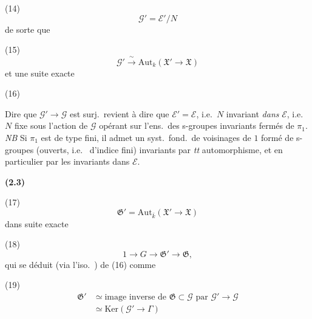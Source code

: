 \documentclass[11pt,a4paper]{article}
\begin{document}
(14)
\[
  \mathcal{G}' = \mathcal{E}'/N
\]
de sorte que

(15)
\[
  \mathcal{G}' \xrightarrow{\ \sim\ } \mathrm{Aut}_k(\mathfrak{X}' \to \mathfrak{X})
\]
et une suite exacte

(16)



Dire que $\mathcal{G}' \to \mathcal{G}$ est surj.\ revient à dire que $\mathcal{E}' = \mathcal{E}$, i.e.\ $N$ invariant \emph{dans} $\mathcal{E}$, i.e.\ $N$  fixe sous l'action de $\mathcal{G}$ opérant sur l'ens.\ des s-groupes invariants fermés de $\pi_1$. \emph{NB} Si $\pi_1$ est de type fini, il admet un syst.\ fond.\ de voisinages de $1$ formé de s-groupes (ouverts, i.e.\  d'indice fini) invariants  par \emph{tt} automorphisme, et en particulier par les invariants dans $\mathcal{E}$.


\textbf{(2.3)} 

(17)
\[
  \mathfrak{G}' = \mathrm{Aut}_{\bar{k}}(\mathfrak{X}' \to \mathfrak{X})
\]
 dans suite exacte

(18)
\[
  1 \to G \to \mathfrak{G}' \to \mathfrak{G} ,
\]
qui se déduit (via l'iso.\ ) de (16) comme

(19)
\[
  \begin{aligned}
    \mathfrak{G}' &\simeq \text{image inverse de } \mathfrak{G} \subset \mathcal{G} \text{ par } \mathcal{G}' \to \mathcal{G} \\
    &\simeq \mathrm{Ker}(\mathcal{G}' \to \Gamma)
  \end{aligned}
\]
\end{document}
